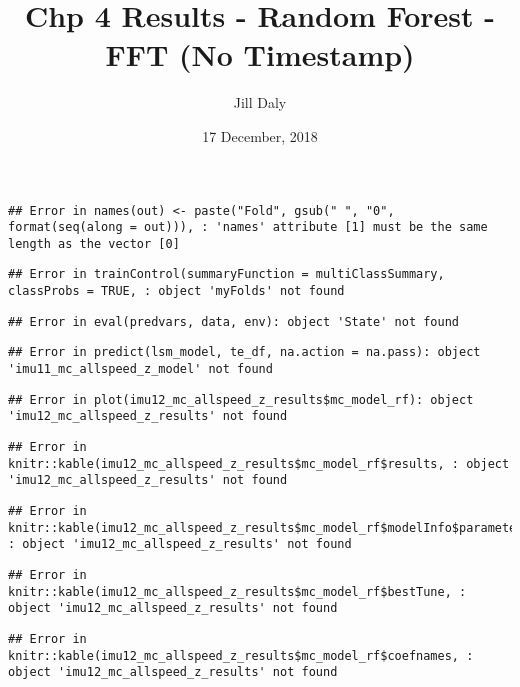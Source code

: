 \documentclass[]{article}
\title{Chp 4 Results - Random Forest - FFT (No Timestamp)}
\author{Jill Daly}
\date{17 December, 2018}
\begin{document}
\maketitle

\begin{verbatim}
## Error in names(out) <- paste("Fold", gsub(" ", "0", format(seq(along = out))), : 'names' attribute [1] must be the same length as the vector [0]
\end{verbatim}

\begin{verbatim}
## Error in trainControl(summaryFunction = multiClassSummary, classProbs = TRUE, : object 'myFolds' not found
\end{verbatim}

\begin{verbatim}
## Error in eval(predvars, data, env): object 'State' not found
\end{verbatim}

\begin{verbatim}
## Error in predict(lsm_model, te_df, na.action = na.pass): object 'imu11_mc_allspeed_z_model' not found
\end{verbatim}

\begin{verbatim}
## Error in plot(imu12_mc_allspeed_z_results$mc_model_rf): object 'imu12_mc_allspeed_z_results' not found
\end{verbatim}

\begin{verbatim}
## Error in knitr::kable(imu12_mc_allspeed_z_results$mc_model_rf$results, : object 'imu12_mc_allspeed_z_results' not found
\end{verbatim}

\begin{verbatim}
## Error in knitr::kable(imu12_mc_allspeed_z_results$mc_model_rf$modelInfo$parameters, : object 'imu12_mc_allspeed_z_results' not found
\end{verbatim}

\begin{verbatim}
## Error in knitr::kable(imu12_mc_allspeed_z_results$mc_model_rf$bestTune, : object 'imu12_mc_allspeed_z_results' not found
\end{verbatim}

\begin{verbatim}
## Error in knitr::kable(imu12_mc_allspeed_z_results$mc_model_rf$coefnames, : object 'imu12_mc_allspeed_z_results' not found
\end{verbatim}
\end{document}
